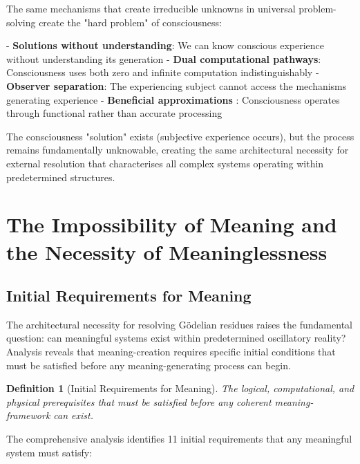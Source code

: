 \documentclass[12pt,a4paper]{article}
\newtheorem{definition}{Definition}
\begin{document}
The same mechanisms that create irreducible unknowns in universal problem-solving create the "hard problem" of consciousness:

- \textbf{Solutions without understanding}: We can know conscious experience without understanding its generation
- \textbf{Dual computational pathways}: Consciousness uses both zero and infinite computation indistinguishably  
- \textbf{Observer separation}: The experiencing subject cannot access the mechanisms generating experience
- \textbf{Beneficial approximations} : Consciousness operates through functional rather than accurate processing

The consciousness "solution" exists (subjective experience occurs), but the process remains fundamentally unknowable, creating the same architectural necessity for external resolution that characterises all complex systems operating within predetermined structures.



\section{The Impossibility of Meaning and the Necessity of Meaninglessness}

\subsection{Initial Requirements for Meaning}

The architectural necessity for resolving Gödelian residues raises the fundamental question: can meaningful systems exist within predetermined oscillatory reality? Analysis reveals that meaning-creation requires specific initial conditions that must be satisfied before any meaning-generating process can begin.

\begin{definition}[Initial Requirements for Meaning]
The logical, computational, and physical prerequisites that must be satisfied before any coherent meaning-framework can exist.
\end{definition}

The comprehensive analysis identifies 11 initial requirements that any meaningful system must satisfy:
\end{document}
